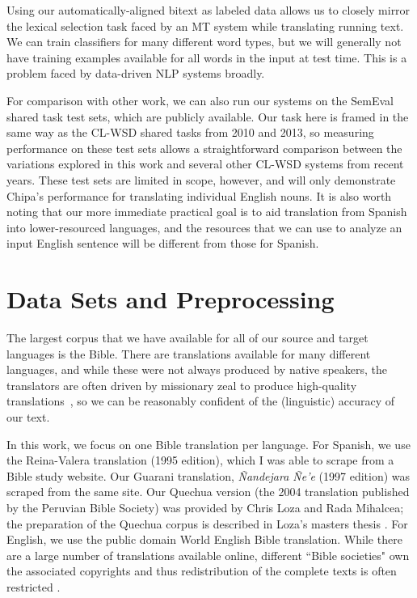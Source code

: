 Using our automatically-aligned bitext as labeled data allows us to closely
mirror the lexical selection task faced by an MT system while translating
running text. We can train classifiers for many different word types, but we
will generally not have training examples available for all words in the input
at test time. This is a problem faced by data-driven NLP systems broadly.

For comparison with other work, we can also run our systems on the SemEval
shared task test sets, which are publicly available. Our task here is framed in
the same way as the CL-WSD shared tasks from 2010 and 2013, so measuring
performance on these test sets allows a straightforward comparison
between the variations explored in this work and several other CL-WSD systems
from recent years. These test sets are limited in scope, however, and will
only demonstrate Chipa's performance for translating individual English nouns.
It is also worth noting that our more immediate practical goal is to aid
translation from Spanish into lower-resourced languages, and the resources that
we can use to analyze an input English sentence will be different from those
for Spanish.


\section{Data Sets and Preprocessing}

The largest corpus that we have available for all of our source and target
languages is the Bible. There are translations available for many different
languages, and while these were not always produced by native speakers, the
translators are often driven by missionary zeal to produce high-quality
translations~\cite{DBLP:journals/lre/ResnikOD99}, so we can be reasonably
confident of the (linguistic) accuracy of our text.

In this work, we focus on one Bible translation per language. For Spanish, we
use the Reina-Valera translation (1995 edition), which I was able to scrape
from a Bible study website. Our Guarani translation, \emph{Ñandejara Ñe'e}
(1997 edition) was scraped from the same site. Our Quechua version (the 2004
translation published by the Peruvian Bible Society) was provided by Chris Loza
and Rada Mihalcea; the preparation of the Quechua corpus is described in Loza's
masters thesis \cite{chrisloza}. For English, we use the public domain World
English Bible translation.
While there are a large number of translations available online, different
``Bible societies" own the associated copyrights and thus redistribution of the
complete texts is often restricted \cite{MAYER14.220.L14-1215}.

